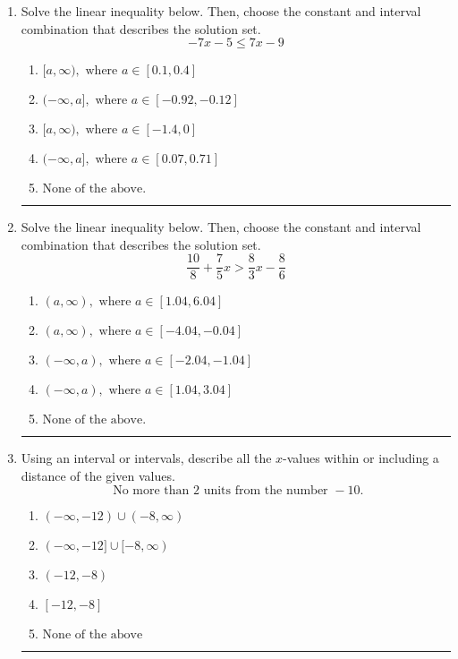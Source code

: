 \documentclass[14pt]{extbook}
\newcommand{\litem}[1]{\item#1\hspace*{-1cm}\rule{\textwidth}{0.4pt}}
\begin{document}
\begin{enumerate}
{\begin{enumerate}[label=\Alph*.]
\end{enumerate} }
\litem{
Solve the linear inequality below. Then, choose the constant and interval combination that describes the solution set.\[ -7x -5 \leq 7x -9 \]\begin{enumerate}[label=\Alph*.]
\item \( [a, \infty), \text{ where } a \in [0.1, 0.4] \)
\item \( (-\infty, a], \text{ where } a \in [-0.92, -0.12] \)
\item \( [a, \infty), \text{ where } a \in [-1.4, 0] \)
\item \( (-\infty, a], \text{ where } a \in [0.07, 0.71] \)
\item \( \text{None of the above}. \)

\end{enumerate} }
\litem{
Solve the linear inequality below. Then, choose the constant and interval combination that describes the solution set.\[ \frac{10}{8} + \frac{7}{5} x > \frac{8}{3} x - \frac{8}{6} \]\begin{enumerate}[label=\Alph*.]
\item \( (a, \infty), \text{ where } a \in [1.04, 6.04] \)
\item \( (a, \infty), \text{ where } a \in [-4.04, -0.04] \)
\item \( (-\infty, a), \text{ where } a \in [-2.04, -1.04] \)
\item \( (-\infty, a), \text{ where } a \in [1.04, 3.04] \)
\item \( \text{None of the above}. \)

\end{enumerate} }
\litem{
Using an interval or intervals, describe all the $x$-values within or including a distance of the given values.\[ \text{ No more than } 2 \text{ units from the number } -10. \]\begin{enumerate}[label=\Alph*.]
\item \( (-\infty, -12) \cup (-8, \infty) \)
\item \( (-\infty, -12] \cup [-8, \infty) \)
\item \( (-12, -8) \)
\item \( [-12, -8] \)
\item \( \text{None of the above} \)


\end{enumerate}}
\end{enumerate}
\end{document}
